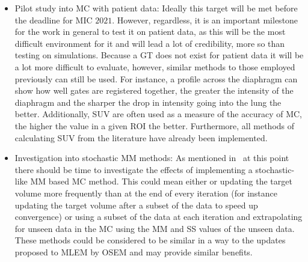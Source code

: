 \begin{itemize}
                \item Pilot study into \gls{MC} with patient data: Ideally this target will be met before the deadline for \gls{MIC} $2021$. However, regardless, it is an important milestone for the work in general to test it on patient data, as this will be the most difficult environment for it and will lead a lot of credibility, more so than testing on simulations. Because a \gls{GT} does not exist for patient data it will be a lot more difficult to evaluate, however, similar methods to those employed previously can still be used. For instance, a profile across the diaphragm can show how well gates are registered together, the greater the intensity of the diaphragm and the sharper the drop in intensity going into the lung the better. Additionally, \gls{SUV} are often used as a measure of the accuracy of \gls{MC}, the higher the value in a given \gls{ROI} the better. Furthermore, all methods of calculating \gls{SUV} from the literature have already been implemented.
    
                \item Investigation into stochastic \gls{MM} methods: As mentioned in~ at this point there should be time to investigate the effects of implementing a stochastic-like \gls{MM} based \gls{MC} method. This could mean either or updating the target volume more frequently than at the end of every iteration (for instance updating the target volume after a subset of the data to speed up convergence) or using a subset of the data at each iteration and extrapolating  for unseen data in the \gls{MC} using the \gls{MM} and \gls{SS} values of the unseen data. These methods could be considered to be similar in a way to the updates proposed to \gls{MLEM} by \gls{OSEM} and may provide similar benefits.
    

\end{itemize}
